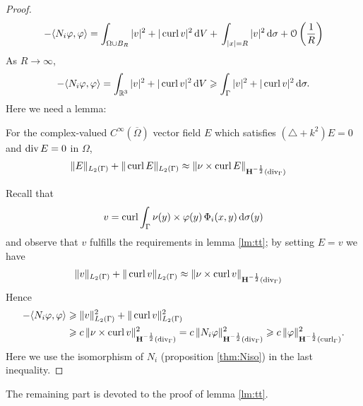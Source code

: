 \begin{proof}
  \begin{align*}
   -\langle N_i\varphi,\varphi\rangle =\int_{\Omega\cup B_R}|v|^2 + |\operatorname{curl} v|^2\,\text{d}V +\,\int_{|x|=R}|v|^2\,\text{d}\sigma+\mathcal{O}\left(\frac{1}{R}\right)
  \end{align*}
  As $R\to\infty$, 
  \begin{align*}
    -\langle N_i\varphi,\varphi\rangle =\int_{\mathbb{R}^3}|v|^2 + |\operatorname{curl} v|^2\,\text{d}V\geqslant \int_{\Gamma}|v|^2 + |\operatorname{curl} v|^2\,\text{d}\sigma.  
  \end{align*}
  Here we need a lemma:
  \begin{lmm}\label{lm:tt}
    For the complex-valued $C^{\infty}(\overline{\Omega})$ vector field $E$
    which satisfies $(\triangle+k^2)E=0$ and $\operatorname{div} E=0$ in $\Omega$,  
    \begin{align*}
      \|E\|_{L_2(\Gamma)} + \|\operatorname{curl} E\|_{L_2(\Gamma)} &\approx \|\nu\times\operatorname{curl} E\|_{{\bf H}^{-\frac{1}{2}}(\operatorname{div}_\Gamma)}
    \end{align*}
  \end{lmm}

  Recall that 
  \begin{align*}
    v = \operatorname{curl}\int_{\Gamma}\nu(y)\times\varphi(y)\,\Phi_i(x,y)\,\text{d}\sigma(y)
  \end{align*}
  and observe that $v$ fulfills the requirements in lemma \ref{lm:tt}; by setting $E=v$ we have
  \begin{align*}
    \|v\|_{L_2(\Gamma)} + \|\operatorname{curl} v\|_{L_2(\Gamma)} &\approx \|\nu\times\operatorname{curl} v\|_{{\bf H}^{-\frac{1}{2}}(\operatorname{div}_\Gamma)}
  \end{align*}   
  Hence
  \begin{align*}
    -\langle N_i\varphi,\varphi\rangle &\geqslant \|v\|_{L_2(\Gamma)}^2 + \|\operatorname{curl} v\|_{L_2(\Gamma)}^2 \\
     &\geqslant c\,\|\nu\times\operatorname{curl} v\|_{{\bf H}^{-\frac{1}{2}}(\operatorname{div}_\Gamma)}^2 = c\,\|N_i\varphi\|_{{\bf H}^{-\frac{1}{2}}(\operatorname{div}_\Gamma)}^2 \geqslant c\,\|\varphi\|_{{\bf H}^{-\frac{1}{2}}(\operatorname{curl}_\Gamma)}^2. 
  \end{align*}
  Here we use the isomorphism of $N_i$ (proposition \ref{thm:Niso}) in the last inequality. 
\end{proof}

The remaining part is devoted to the proof of lemma \ref{lm:tt}.


